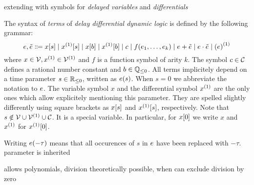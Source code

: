 extending \dL with symbols for \emph{delayed variables} and \emph{differentials}
    \begin{definition}[Terms]\label{def:syntax-terms}
        The syntax of \emph{terms} of \emph{delay differential dynamic logic} is defined by the following grammar:
        \begin{equation*}
            \astrm,\bstrm \Coloneqq
                \x[s] \mid
                \Dx[s] \mid
                \x[b] \mid
                \Dx[b] \mid
                c \mid
                f(\range{\istrm{1}}{\istrm{k}}) \mid
                \astrm + \bstrm \mid
                \astrm \cdot \bstrm \mid
                \D{(\astrm)}
        \end{equation*}
        where $x\in\allvars,\D{x}\in\diffvars$ and $f$ is a function symbol of arity $k$.
        The symbol $c\in\mathcal{C}_{}$ defines a rational number constant and $b\in\mathbb{Q}_{\leq 0}$.
        All terms implicitely depend on a time parameter $s\in\mathbb{R}_{\leq 0}$, written as $e(s)$. When $s=0$ we abbreviate the notation to $e$.
        The variable symbol $x$ and the differential symbol $\D{x}$ are the only ones which allow explicitely mentioning this parameter. They are spelled slightly differently using square brackets as $x[s]$ and $\Dx[s]$, respectively. Note that $s\notin\allvars\cup\diffvars\cup\constants$. It is a special variable.
        In particular, for $x[0]$ we write $x$ and $\D{x}$ for $\Dx[0]$.

        Writing $e(-\tau)$ means that all occurences of $s$ in $e$ have been replaced with $-\tau$.
        parameter is inherited

        allows polynomials,
        division theoretically possible, when can exclude division by zero

    \end{definition}

